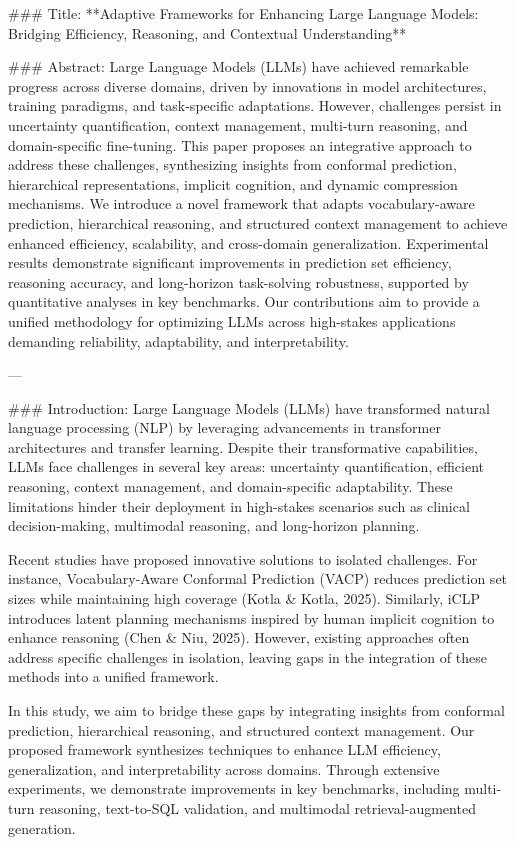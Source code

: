 ### Title:
**Adaptive Frameworks for Enhancing Large Language Models: Bridging Efficiency, Reasoning, and Contextual Understanding**

### Abstract:
Large Language Models (LLMs) have achieved remarkable progress across diverse domains, driven by innovations in model architectures, training paradigms, and task-specific adaptations. However, challenges persist in uncertainty quantification, context management, multi-turn reasoning, and domain-specific fine-tuning. This paper proposes an integrative approach to address these challenges, synthesizing insights from conformal prediction, hierarchical representations, implicit cognition, and dynamic compression mechanisms. We introduce a novel framework that adapts vocabulary-aware prediction, hierarchical reasoning, and structured context management to achieve enhanced efficiency, scalability, and cross-domain generalization. Experimental results demonstrate significant improvements in prediction set efficiency, reasoning accuracy, and long-horizon task-solving robustness, supported by quantitative analyses in key benchmarks. Our contributions aim to provide a unified methodology for optimizing LLMs across high-stakes applications demanding reliability, adaptability, and interpretability.

---

### Introduction:
Large Language Models (LLMs) have transformed natural language processing (NLP) by leveraging advancements in transformer architectures and transfer learning. Despite their transformative capabilities, LLMs face challenges in several key areas: uncertainty quantification, efficient reasoning, context management, and domain-specific adaptability. These limitations hinder their deployment in high-stakes scenarios such as clinical decision-making, multimodal reasoning, and long-horizon planning.

Recent studies have proposed innovative solutions to isolated challenges. For instance, Vocabulary-Aware Conformal Prediction (VACP) reduces prediction set sizes while maintaining high coverage (Kotla & Kotla, 2025). Similarly, iCLP introduces latent planning mechanisms inspired by human implicit cognition to enhance reasoning (Chen & Niu, 2025). However, existing approaches often address specific challenges in isolation, leaving gaps in the integration of these methods into a unified framework.

In this study, we aim to bridge these gaps by integrating insights from conformal prediction, hierarchical reasoning, and structured context management. Our proposed framework synthesizes techniques to enhance LLM efficiency, generalization, and interpretability across domains. Through extensive experiments, we demonstrate improvements in key benchmarks, including multi-turn reasoning, text-to-SQL validation, and multimodal retrieval-augmented generation.

